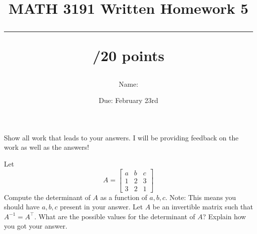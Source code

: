 \documentclass{exam}
\title{MATH 3191 Written Homework 5\\\rule{30pt}{1pt}/20 points}
\author{Name: \rule{150pt}{1pt}}
\date{Due: February 23rd}
\begin{document}
\maketitle
Show all work that leads to your answers. I will be providing feedback on the work as well as the answers!
\begin{questions}
    \question[10] Let 
    \[
        A = \begin{bmatrix}
            a & b & c\\
            1 & 2 & 3\\
            3 & 2 & 1
        \end{bmatrix}
    \]
    Compute the determinant of $A$ as a function of $a,b,c$. Note: This means you should have
    $a,b,c$ present in your answer.
    \newpage
    \question[10] Let $A$ be an invertible matrix such that $A^{-1} = A^\top$. What are the possible
    values for the determinant of $A$? Explain how you got your answer.
\end{questions}
\end{document}
